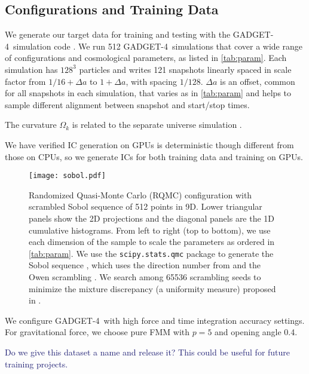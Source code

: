 \documentclass[modern, trackchanges, dvipsnames]{aastex631}
\newcommand{\GADGET}{{{\fontsize{10pt}{12pt}\selectfont GADGET}-4}}
\newcommand{\YZ}[1]{\textcolor{MidnightBlue}{#1}}
\begin{document}
\vspace{1em}
\subsection{Configurations and Training Data}

We generate our target data for training and testing with the \GADGET\
simulation code \citep{GADGET-4}.
We run 512 \GADGET\ simulations that cover a wide range of
configurations and cosmological parameters, as listed in
\autoref{tab:param}.
Each simulation has $128^3$ particles and writes 121 snapshots linearly
spaced in scale factor from $1/16 + \Delta a$ to $1 + \Delta a$, with
spacing $1/128$.
$\Delta a$ is an offset, common for all snapshots in each simulation,
that varies as in \autoref{tab:param} and helps to sample different
alignment between snapshot and start/stop times.

The curvature $\Omega_k$ is related to the separate universe simulation
\citep{LiEtAl2014, WagnerEtAl2015}.

We have verified IC generation on GPUs is deterministic though different
from those on CPUs, so we generate ICs for both training data and
training on GPUs.


\begin{figure*}
  \centering
  \texttt{[image: sobol.pdf]}
  \caption{Randomized Quasi-Monte Carlo (RQMC) configuration with
    scrambled Sobol sequence of 512 points in 9D.
    Lower triangular panels show the 2D projections and the diagonal
    panels are the 1D cumulative histograms.
    From left to right (top to bottom), we use each dimension of the
    sample to scale the parameters as ordered in \autoref{tab:param}.
    We use the \texttt{scipy.stats.qmc} package \citep{SciPy} to
    generate the Sobol sequence \citep{Sobol1967}, which uses the
    direction number from \citet{JoeKuo2008} and the Owen scrambling
    \citep{Owen1998}.
    We search among 65536 scrambling seeds to minimize the mixture
    discrepancy (a uniformity measure) proposed in \citet{Zhou2013MD}.
  }
  \label{fig:sobol}
\end{figure*}


We configure \GADGET\ with high force and time integration accuracy
settings.
For gravitational force, we choose pure FMM with $p=5$ and opening angle
0.4.

\YZ{Do we give this dataset a name and release it? This could be useful for
future training projects.}
\end{document}
